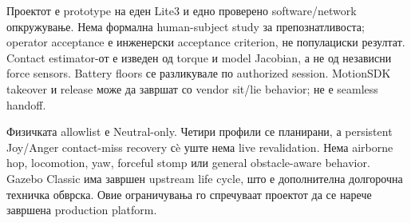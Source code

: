 Проектот е prototype на еден Lite3 и едно проверено software/network
опкружување. Нема формална human-subject study за препознатливоста; operator
acceptance е инженерски acceptance criterion, не популациски резултат. Contact
estimator-от е изведен од torque и model Jacobian, а не од независни force
sensors. Battery floors се разликувале по authorized session. MotionSDK
takeover и release може да завршат со vendor sit/lie behavior; не е seamless
handoff.

Физичката allowlist е Neutral-only. Четири профили се планирани, а persistent
Joy/Anger contact-miss recovery сè уште нема live revalidation. Нема airborne
hop, locomotion, yaw, forceful stomp или general obstacle-aware behavior.
Gazebo Classic има завршен upstream life cycle, што е дополнителна долгорочна
техничка обврска. Овие ограничувања го спречуваат
проектот да се нарече завршена production platform.
